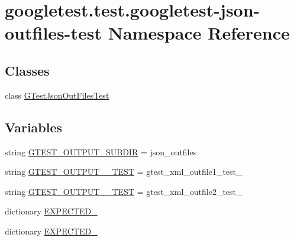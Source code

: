 \hypertarget{namespacegoogletest_1_1test_1_1googletest-json-outfiles-test}{}\section{googletest.\+test.\+googletest-\/json-\/outfiles-\/test Namespace Reference}
\label{namespacegoogletest_1_1test_1_1googletest-json-outfiles-test}
\subsection*{Classes}
\begin{DoxyCompactItemize}
\item 
class \mbox{\hyperlink{classgoogletest_1_1test_1_1googletest-json-outfiles-test_1_1_g_test_json_out_files_test}{G\+Test\+Json\+Out\+Files\+Test}}
\end{DoxyCompactItemize}
\subsection*{Variables}
\begin{DoxyCompactItemize}
\item 
string \mbox{\hyperlink{namespacegoogletest_1_1test_1_1googletest-json-outfiles-test_a2b934ba218db4ed72501cdb88d57bc05}{G\+T\+E\+S\+T\+\_\+\+O\+U\+T\+P\+U\+T\+\_\+\+S\+U\+B\+D\+IR}} = \textquotesingle{}json\+\_\+outfiles\textquotesingle{}
\item 
string \mbox{\hyperlink{namespacegoogletest_1_1test_1_1googletest-json-outfiles-test_a4d234140f7efaeec58690050b12238fa}{G\+T\+E\+S\+T\+\_\+\+O\+U\+T\+P\+U\+T\+\_\+\_\+\+T\+E\+ST}} = \textquotesingle{}gtest\+\_\+xml\+\_\+outfile1\+\_\+test\+\_\+\textquotesingle{}
\item 
string \mbox{\hyperlink{namespacegoogletest_1_1test_1_1googletest-json-outfiles-test_adf9b46aebfc54e6cb305c48dd6caf3da}{G\+T\+E\+S\+T\+\_\+\+O\+U\+T\+P\+U\+T\+\_\+\_\+\+T\+E\+ST}} = \textquotesingle{}gtest\+\_\+xml\+\_\+outfile2\+\_\+test\+\_\+\textquotesingle{}
\item 
dictionary \mbox{\hyperlink{namespacegoogletest_1_1test_1_1googletest-json-outfiles-test_aa849cc5380c24313fe0dd95b85df05b0}{E\+X\+P\+E\+C\+T\+E\+D\+\_}}
\item 
dictionary \mbox{\hyperlink{namespacegoogletest_1_1test_1_1googletest-json-outfiles-test_a7ca68d2c17ef378a1f6415dd9e85bae1}{E\+X\+P\+E\+C\+T\+E\+D\+\_}}
\end{DoxyCompactItemize}


